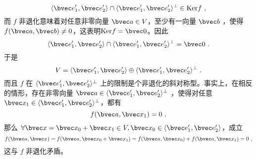 \begin{equation}
\langle\bvec e'_1,\bvec e'_2\rangle\cap\langle\bvec e'_1,\bvec e'_2\rangle^{\perp}\in \mathrm{Ker} f~,
\end{equation}
而 $f$ 非退化意味着对任意非零向量 $\bvec a\in V$，至少有一向量 $\bvec b$ ，使得 $f(\bvec a,\bvec b)\neq0$，这表明$\mathrm{Ker} f=\bvec 0$。因此
\begin{equation}
\langle\bvec e'_1,\bvec e'_2\rangle\cap\langle\bvec e'_1,\bvec e'_2\rangle^{\perp}=\bvec 0~.
\end{equation}
于是
\begin{equation}
V=\langle\bvec e'_1,\bvec e'_2\rangle\oplus\langle\bvec e'_1,\bvec e'_2\rangle^{\perp}~.
\end{equation}
而且 $f$ 在 $\langle\bvec e'_1,\bvec e'_2\rangle^{\perp}$ 上的限制是个非退化的斜对称型。事实上，在相反的情形，存在非零向量 $\bvec a\in \langle\bvec e'_1,\bvec e'_2\rangle^{\perp}$ ，使得对任意 $\bvec x_1\in\langle\bvec e'_1,\bvec e'_2\rangle^{\perp}$，都有
\begin{equation}
f(\bvec a,\bvec x_1)=0~.
\end{equation}
那么 $\forall \bvec x=\bvec x_0+\bvec x_1\in V,\bvec x_0\in\langle\bvec e'_1,\bvec e'_2\rangle$，成立
\begin{equation}
f(\bvec a,\bvec x)=f(\bvec a,\bvec x_0+\bvec x_1)=f(\bvec a,\bvec x_0)+f(\bvec a,\bvec x_1)=0~,
\end{equation}
这与 $f$ 非退化矛盾。


